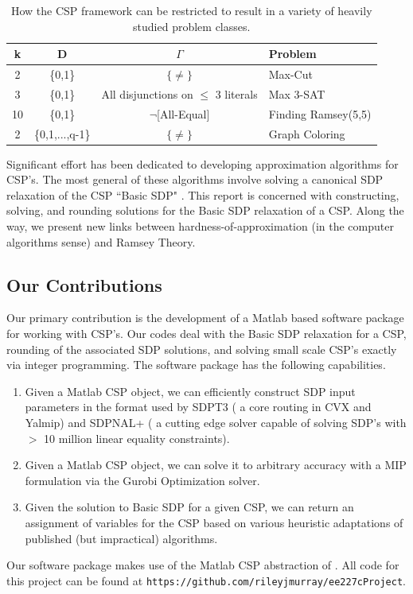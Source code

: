 \documentclass[12pt]{article} %
\begin{document}
\begin{table}
\begin{center}
\begin{tabular}{c c c l}
\hline
k & D & $\Gamma$ & Problem \\
\hline
2  & \{0,1\} & $\{\neq\}$ & Max-Cut \\
3  & \{0,1\} & All disjunctions on $\leq $ 3 literals & Max 3-SAT \\
10 & \{0,1\} & $\neg$[All-Equal] & Finding Ramsey(5,5) \\
2  & \{0,1,...,q-1\} & $\{\neq\}$ & Graph Coloring \\
\hline
\end{tabular}
\caption{How the CSP framework can be restricted to result in a variety of heavily studied problem classes.}
\label{cspclasses}
\end{center}
\end{table}

Significant effort has been dedicated to developing approximation algorithms for CSP's. The most general of these algorithms involve solving a canonical SDP relaxation of the CSP ``Basic SDP" \cite{raghavendra2008optimal}. This report is concerned with constructing, solving, and rounding solutions for the Basic SDP relaxation of a CSP. Along the way, we present new links between hardness-of-approximation (in the computer algorithms sense) and Ramsey Theory.


\subsection{Our Contributions}
 
Our primary contribution is the development of a Matlab based software package for working with CSP's. Our codes deal with the Basic SDP relaxation for a CSP, rounding of the associated SDP solutions, and solving small scale CSP's exactly via integer programming. The software package has the following capabilities.

\begin{enumerate}
\item Given a Matlab CSP object, we can efficiently construct SDP input parameters in the format used by SDPT3 ( a core routing in CVX and Yalmip) and SDPNAL+ ( a cutting edge solver capable of solving SDP's with $>$ 10 million linear equality constraints).

\item Given a Matlab CSP object, we can solve it to arbitrary accuracy with a MIP formulation via the Gurobi Optimization solver.

\item Given the solution to Basic SDP for a given CSP, we can return an assignment of variables for the CSP based on various heuristic adaptations of published (but impractical) algorithms.
\end{enumerate}
Our software package makes use of the Matlab CSP abstraction of \cite{dwivedi2015introduction}. All code for this project can be found at \texttt{https://github.com/rileyjmurray/ee227cProject}.
\end{document}
